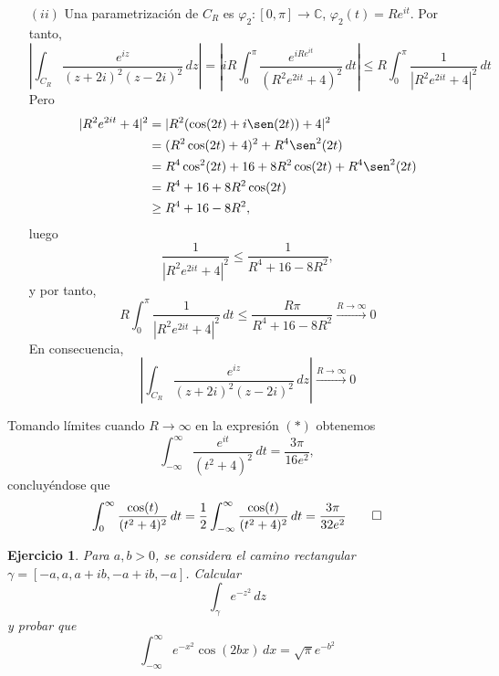 \documentclass[11pt]{report}
\makeatletter
\renewenvironment{proof}[1][\proofname]{\par
  \pushQED{\qed}%
  \normalfont \topsep\z@skip %
  \trivlist
  \item[\hskip\labelsep
        \itshape
    #1\@addpunct{.}]\ignorespaces
}{%
  \popQED\endtrivlist\@endpefalse
}
\newcommand{\C}{\mathbb C}
\newtheorem{exercise}{Ejercicio}
\makeatother
\begin{document}
\begin{proof}
\begin{itemize}
    \item[$(ii)$] Una parametrización de $C_R$ es $\varphi_2 \colon [0,\pi] \to \C$, $\varphi_2(t) = Re^{it}$. Por tanto,
    \[\left|\int_{C_R} \frac{e^{iz}}{(z+2i)^2(z-2i)^2} \, dz \right|= \left|iR\int_0^\pi \frac{e^{iRe^{it}}}{(R^2e^{2it}+4)^2} \, dt\right| \leq R\int_0^\pi \frac{1}{|R^2e^{2it}+4|^2} \, dt \]
    Pero
    \[\begin{aligned}[t]
        |R^2e^{2it}+4|^2 &= |R^2(\cos(2t)+i\sen(2t))+4|^2 \\ &= (R^2\cos(2t)+4)^2+R^4\sen^2(2t) \\
        &=R^4\cos^2(2t)+16+8R^2\cos(2t)+R^4\sen^2(2t) \\
        &=R^4+16+8R^2\cos(2t) \\ &\geq R^4+16-8R^2,
    \end{aligned}\]
    luego
    \[\frac{1}{|R^2e^{2it}+4|^2} \leq \frac{1}{R^4+16-8R^2},\]
    y por tanto,
    \[R\int_0^\pi \frac{1}{|R^2e^{2it}+4|^2} \, dt \leq \frac{R\pi}{R^4+16-8R^2} \xrightarrow[]{R \to \infty} 0\]
    En consecuencia,
    \[\left|\int_{C_R} \frac{e^{iz}}{(z+2i)^2(z-2i)^2} \, dz \right| \xrightarrow[]{R \to \infty} 0\]
\end{itemize}
Tomando límites cuando $R \to \infty$ en la expresión $(*)$ obtenemos
\[\int_{-\infty}^{\infty}\frac{e^{it}}{(t^2+4)^2} \, dt = \frac{3\pi}{16e^2},\]
concluyéndose que
\[\int_0^\infty \frac{\cos(t)}{(t^2+4)^2} \, dt = \frac{1}{2}\int_{-\infty}^\infty\frac{\cos(t)}{(t^2+4)^2} \, dt =\frac{3\pi}{32e^2} \qedhere\]
\end{proof}

\begin{exercise}
Para $a,b>0$, se considera el camino rectangular $\gamma = [-a,a,a+ib,-a+ib,-a]$. Calcular \[\int_\gamma e^{-z^2} \, dz\] y probar que
\[\int_{-\infty}^\infty e^{-x^2}\cos(2bx) \, dx = \sqrt{\pi}e^{-b^2}\]
\end{exercise}
\end{document}
